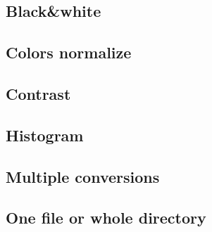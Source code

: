 \documentclass[oneside,11pt]{article}
\begin{document}
\subsection{Black\&white}
\subsection{Colors normalize}
\subsection{Contrast}
\subsection{Histogram}
\subsection{Multiple conversions}
\subsection{One file or whole directory}
\end{document}
